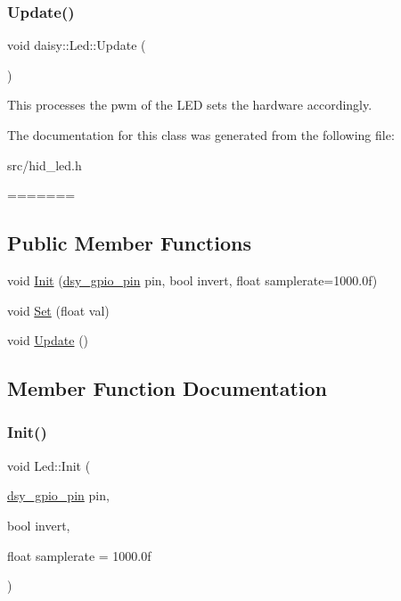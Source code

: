 \subsubsection{\texorpdfstring{Update()}{Update()}}
{\footnotesize\ttfamily void daisy\+::\+Led\+::\+Update (\begin{DoxyParamCaption}{ }\end{DoxyParamCaption})}

This processes the pwm of the L\+ED sets the hardware accordingly. 

The documentation for this class was generated from the following file\+:\begin{DoxyCompactItemize}
\item 
src/hid\+\_\+led.\+h\end{DoxyCompactItemize}
=======
\subsection*{Public Member Functions}
\begin{DoxyCompactItemize}
\item 
void \hyperlink{classdaisy_1_1_led_a46819d4aa92d8744edc02bf8911c4fba}{Init} (\hyperlink{structdsy__gpio__pin}{dsy\+\_\+gpio\+\_\+pin} pin, bool invert, float samplerate=1000.\+0f)
\item 
void \hyperlink{classdaisy_1_1_led_a007d36b37dee07e43b65789f1501b628}{Set} (float val)
\item 
void \hyperlink{classdaisy_1_1_led_ae8cbdb3e29cdc4f1f2aa50d7ce470fc9}{Update} ()
\end{DoxyCompactItemize}


\subsection{Member Function Documentation}
\mbox{\label{classdaisy_1_1_led_a46819d4aa92d8744edc02bf8911c4fba}} 
\subsubsection{\texorpdfstring{Init()}{Init()}}
{\footnotesize\ttfamily void Led\+::\+Init (\begin{DoxyParamCaption}\item[{\hyperlink{structdsy__gpio__pin}{dsy\+\_\+gpio\+\_\+pin}}]{pin,  }\item[{bool}]{invert,  }\item[{float}]{samplerate = {\ttfamily 1000.0f} }\end{DoxyParamCaption})}


